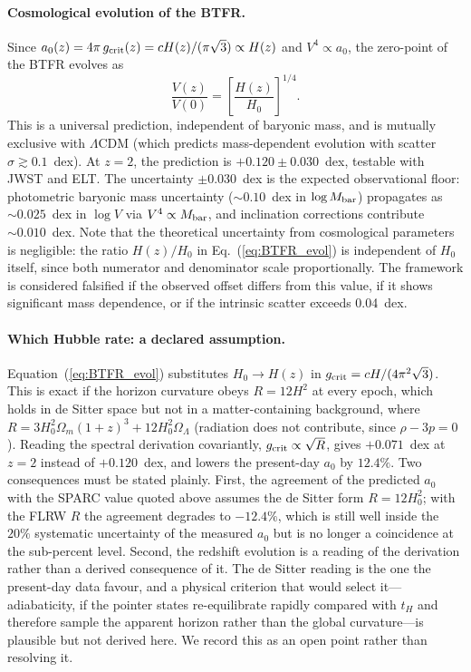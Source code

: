 \documentclass[11pt,a4paper]{article}
\begin{document}
\paragraph{Cosmological evolution of the BTFR.}
Since $a_0(z) = 4\pi\,g_{\rm crit}(z) = cH(z)/(\pi\sqrt{3})\propto H(z)$ and $V^4\propto a_0$,
the zero-point of the BTFR evolves as
\begin{equation}
  \frac{V(z)}{V(0)} = \left[\frac{H(z)}{H_0}\right]^{1/4}.
  \label{eq:BTFR_evol}
\end{equation}
This is a universal prediction, independent of baryonic mass, and is mutually exclusive
with $\Lambda$CDM (which predicts mass-dependent evolution with scatter $\sigma\gtrsim0.1$~dex).
At $z=2$, the prediction is $+0.120\pm0.030$~dex, testable with JWST and ELT.
The uncertainty $\pm0.030$~dex is the expected observational floor: photometric
baryonic mass uncertainty ($\sim0.10$~dex in $\log M_{\rm bar}$) propagates as
$\sim0.025$~dex in $\log V$ via $V^4\propto M_{\rm bar}$, and inclination
corrections contribute $\sim0.010$~dex.  Note that the theoretical uncertainty
from cosmological parameters is negligible: the ratio $H(z)/H_0$ in
Eq.~(\ref{eq:BTFR_evol}) is independent of $H_0$ itself, since both numerator
and denominator scale proportionally.
The framework is considered falsified if the observed offset differs from this value,
if it shows significant mass dependence, or if the intrinsic scatter exceeds 0.04~dex.

\paragraph{Which Hubble rate: a declared assumption.}
Equation~(\ref{eq:BTFR_evol}) substitutes $H_0\to H(z)$ in
$g_{\rm crit}=cH/(4\pi^2\sqrt3)$. This is exact if the horizon curvature obeys
$R=12H^2$ at every epoch, which holds in de Sitter space but not in a
matter-containing background, where $R=3H_0^2\Omega_m(1+z)^3+12H_0^2\Omega_\Lambda$
(radiation does not contribute, since $\rho-3p=0$). Reading the spectral
derivation covariantly, $g_{\rm crit}\propto\sqrt{R}$, gives $+0.071$~dex at
$z=2$ instead of $+0.120$~dex, and lowers the present-day $a_0$ by $12.4\%$.
Two consequences must be stated plainly. First, the agreement of the
predicted $a_0$ with the SPARC value quoted above assumes the de Sitter form
$R=12H_0^2$; with the FLRW $R$ the agreement degrades to $-12.4\%$, which is
still well inside the $20\%$ systematic uncertainty of the measured $a_0$ but
is no longer a coincidence at the sub-percent level. Second, the redshift
evolution is a reading of the derivation rather than a derived consequence of
it. The de Sitter reading is the one the present-day data favour, and a
physical criterion that would select it---adiabaticity, if the pointer states
re-equilibrate rapidly compared with $t_H$ and therefore sample the apparent
horizon rather than the global curvature---is plausible but not derived here.
We record this as an open point rather than resolving it.
\end{document}
